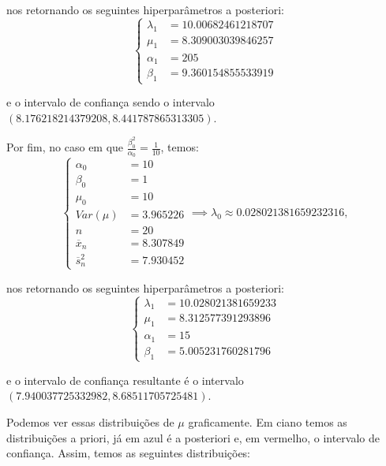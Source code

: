 \documentclass{article}
\begin{document}
\noindent nos retornando os seguintes hiperparâmetros a posteriori:
\begin{equation*}
    \left\{
        \begin{array}{ll}
            \lambda_1 & = 10.00682461218707 \\
            \mu_1 & = 8.309003039846257 \\
            \alpha_1 & = 205 \\
            \beta_1 & = 9.360154855533919
        \end{array}
    \right.
\end{equation*}

\noindent e o intervalo de confiança sendo o intervalo $(8.176218214379208, 8.441787865313305)$.

Por fim, no caso em que $\frac{\beta_0^2}{\alpha_0} = \frac{1}{10}$, temos:
\begin{equation*}
    \left\{
        \begin{array}{ll}
            \alpha_0 & = 10 \\
            \beta_0 & = 1 \\
            \mu_0 & = 10 \\
            Var(\mu) & = 3.965226 \\
            n & = 20 \\
            \overline{x}_n & = 8.307849 \\
            \overline{s}_n^2 & = 7.930452
        \end{array}
    \right.
    \implies \lambda_0 \approx 0.028021381659232316,
\end{equation*}

\noindent nos retornando os seguintes hiperparâmetros a posteriori:
\begin{equation*}
    \left\{
        \begin{array}{ll}
            \lambda_1 & = 10.028021381659233 \\
            \mu_1 & = 8.312577391293896 \\
            \alpha_1 & = 15 \\
            \beta_1 & = 5.005231760281796
        \end{array}
    \right.
\end{equation*}

\noindent e o intervalo de confiança resultante é o intervalo $(7.940037725332982, 8.68511705725481)$.

Podemos ver essas distribuições de $\mu$ graficamente. Em ciano temos as distribuições a priori, já em azul é a posteriori e, em vermelho, o intervalo de confiança. Assim, temos as seguintes distribuições:
\end{document}
